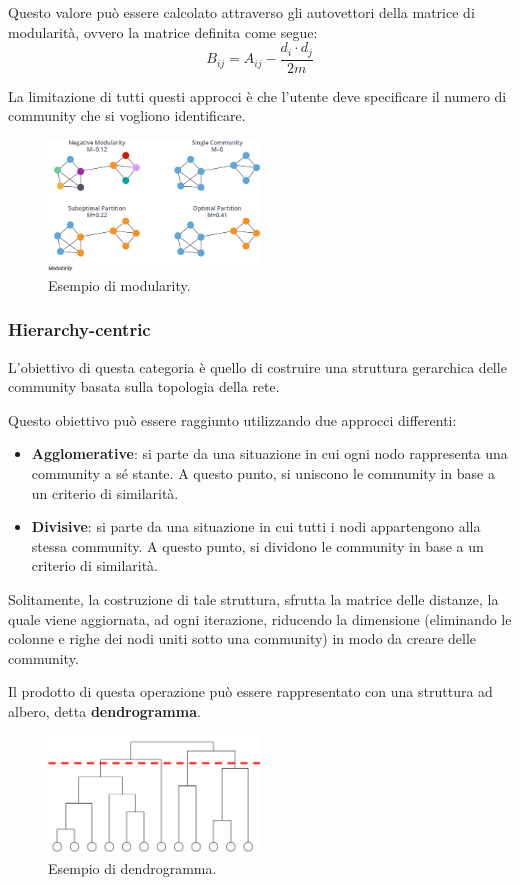 Questo valore può essere calcolato attraverso gli autovettori della matrice di
modularità, ovvero la matrice definita come segue:
\begin{equation}
    B_{ij} = A_{ij} - \frac{d_i \cdot d_j}{2m}
\end{equation}
\begin{nota}
    La limitazione di tutti questi approcci è che l'utente deve specificare il
    numero di community che si vogliono identificare.
\end{nota}
\begin{figure}[!ht]
    \centering
    \includegraphics[width=0.5\textwidth]{./img/net/modularity.png}
    \caption{Esempio di modularity.}
    \label{fig:modularity}
\end{figure}
\subsubsection{Hierarchy-centric}
L'obiettivo di questa categoria è quello di costruire una struttura gerarchica
delle community basata sulla topologia della rete.

Questo obiettivo può essere raggiunto utilizzando due approcci differenti:
\begin{itemize}
    \item \textbf{Agglomerative}: si parte da una situazione in cui ogni nodo
          rappresenta una community a sé stante. A questo punto, si uniscono
          le community in base a un criterio di similarità.
    \item \textbf{Divisive}: si parte da una situazione in cui tutti i nodi
          appartengono alla stessa community. A questo punto, si dividono le
          community in base a un criterio di similarità.
\end{itemize}
Solitamente, la costruzione di tale struttura, sfrutta la matrice delle distanze,
la quale viene aggiornata, ad ogni iterazione, riducendo la dimensione (eliminando
le colonne e righe dei nodi uniti sotto una community) in modo da creare delle
community.

Il prodotto di questa operazione può essere rappresentato con una struttura ad
albero, detta \textbf{dendrogramma}.
\begin{figure}[!ht]
    \centering
    \includegraphics[width=0.5\textwidth]{./img/net/dendrogram.png}
    \caption{Esempio di dendrogramma.}
    \label{fig:dendrogram}
\end{figure}

